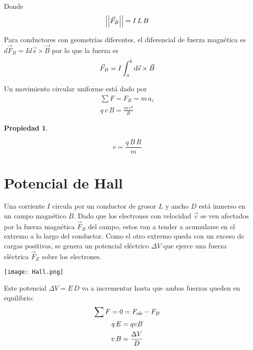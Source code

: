 \documentclass[a5paper,12pt,twoside]{book}
\newtheorem{prop}{{Propiedad}}[chapter]
\begin{document}
Donde
\begin{equation*}
    {\left|\left| {\Vec{F}_B} \right|\right|} = I \, L \, B
\end{equation*}

Para conductores con geometrías diferentes, el diferencial de fuerza magnética es $d \Vec{F}_B = I d\Vec{s} \times \Vec{B}$ por lo que la fuerza es
\begin{equation*}
    \Vec{F}_B = I \int_a^b \textsl{d} \Vec{s} \times \Vec{B}
\end{equation*}

Un movimiento circular uniforme está dado por
\begin{gather*}
    \sum F = F_B = m \, a_c
    \\
    q \, v \, B = \frac{m \, v^2}{R}
\end{gather*}

\begin{mdframed}[style=MyFrame1]
    \begin{prop}
    \end{prop}
    \begin{equation*}
        v = \frac{q \, B \, R}{m}
    \end{equation*}
\end{mdframed}


\section{Potencial de Hall}

Una corriente $I$ circula por un conductor de grosor $L$ y ancho $D$ está inmerso en un campo magnético $B$. Dado que los electrones con velocidad $\Vec{v}$ se ven afectados por la fuerza magnética $\Vec{F}_B$ del campo, estos van a tender a acumularse en el extremo a lo largo del conductor. Como el otro extremo queda con un exceso de cargas positivas, se genera un potencial eléctrico $\Delta V$ que ejerce una fuerza eléctrica $\Vec{F}_E$ sobre los electrones.

\begin{center}
    \texttt{[image: Hall.png]}
\end{center}

Este potencial $\Delta V = E \, D$ va a incrementar hasta que ambas fuerzas queden en equilibrio:
\begin{gather*}
    \sum F = 0 = {{F}_\textsl{{ele}}} - F_B
    \\
    q \, E = qvB
    \\
    v \, B = \frac{\Delta V}{D}
\end{gather*}
\end{document}
